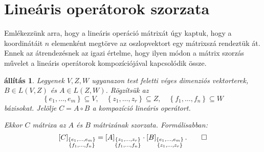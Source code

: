 \documentclass[9pt, a4paper, showtrims]{memoir}
\theoremstyle{plain}
\newtheorem{proposition}{állítás}[chapter]
\theoremstyle{remark}
\theoremstyle{definition}
\begin{document}
\section{Lineáris operátorok szorzata}
Emlékezzünk arra, hogy a lineáris operáció mátrixát úgy kaptuk, hogy a koordinátáit $n$ elemenként
megtörve az oszlopvektort egy mátrixszá rendeztük át.
Ennek az átrendezésnek az igazi értelme, hogy ilyen módon a mátrix szorzás művelet a lineáris operátorok kompozíciójával
kapcsolódik össze.
\begin{proposition}
    Legyenek $V,Z,W$ ugyanazon test feletti véges dimenziós vektorterek,
    $B \in L\left( V,Z \right)$ és $A \in L\left( Z,W \right)$.
    Rögzítsük az 
    \[
        \left\{ e_1,\dots,e_m \right\}\subseteq V,\quad
        \left\{ z_1,\dots,z_r \right\}\subseteq Z,\quad
        \left\{ f_1,\dots,f_n \right\}\subseteq W
    \]
    bázisokat.
    Jelölje $C=A\circ B$ a kompozíció lineáris operátort.

    Ekkor $C$ mátrixa az $A$ és $B$ mátrixának szorzata.
    Formálisabban:
    \[
        \left[ C \right]_{\substack{\left\{ e_1,\dots,e_m \right\}\\ \left\{ f_1,\dots,f_n \right\}}}
        =
        \left[ A \right]_{\substack{\left\{ z_1,\dots,z_r \right\}\\ \left\{ f_1,\dots,f_n \right\}}}
        \cdot
        \left[ B \right]_{\substack{\left\{ e_1,\dots,e_m \right\}\\ \left\{ z_1,\dots,z_r \right\}}}.\qedhere
    \]
\end{proposition}
\end{document}

